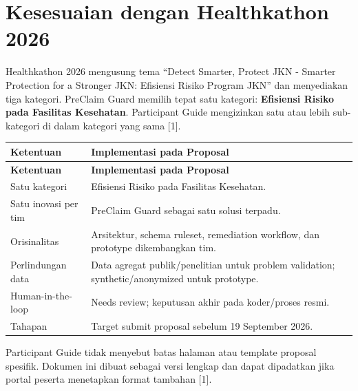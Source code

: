 \documentclass[11pt,a4paper]{article}
\begin{document}
\section{Kesesuaian dengan Healthkathon 2026}
Healthkathon 2026 mengusung tema ``Detect Smarter, Protect JKN - Smarter Protection for a Stronger JKN: Efisiensi Risiko Program JKN'' dan menyediakan tiga kategori. PreClaim Guard memilih tepat satu kategori: \textbf{Efisiensi Risiko pada Fasilitas Kesehatan}. Participant Guide mengizinkan satu atau lebih sub-kategori di dalam kategori yang sama [1].
\begin{longtable}{|p{4cm}|p{11cm}|}
\hline
\rowcolor{blue!15} \textbf{Ketentuan} & \textbf{Implementasi pada Proposal} \\ \hline
\endfirsthead
\hline
\rowcolor{blue!15} \textbf{Ketentuan} & \textbf{Implementasi pada Proposal} \\ \hline
\endhead
Satu kategori & Efisiensi Risiko pada Fasilitas Kesehatan. \\ \hline
Satu inovasi per tim & PreClaim Guard sebagai satu solusi terpadu. \\ \hline
Orisinalitas & Arsitektur, schema ruleset, remediation workflow, dan prototype dikembangkan tim. \\ \hline
Perlindungan data & Data agregat publik/penelitian untuk problem validation; synthetic/anonymized untuk prototype. \\ \hline
Human-in-the-loop & Needs review; keputusan akhir pada koder/proses resmi. \\ \hline
Tahapan & Target submit proposal sebelum 19 September 2026. \\ \hline
\end{longtable}
Participant Guide tidak menyebut batas halaman atau template proposal spesifik. Dokumen ini dibuat sebagai versi lengkap dan dapat dipadatkan jika portal peserta menetapkan format tambahan [1].
\end{document}
